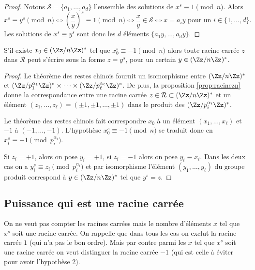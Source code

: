 \documentclass[11pt,class=report,crop=false]{standalone}
\begin{document}
\begin{proof}
Notons $\mathcal{S} = \{a_1,\ldots,a_d\}$ l'ensemble des solutions de $x^s \equiv 1 \pmod n$. Alors
$$x^s \equiv y^s \pmod n \iff \left( \frac{x}{y} \right)^s \equiv 1 \pmod n
\iff  \frac{x}{y} \in \mathcal{S} \iff x = a_iy \text { pour un } i \in \{1,\ldots,d\}.$$
Les solutions de $x^s \equiv y^s$ sont donc les $d$ éléments $\{a_1y,\ldots,a_dy\}$.
\end{proof}


\begin{lemme}
\label{lem:xs2}
S'il existe $x_0\in(\Zz/n\Zz)^*$ tel que $x_0^s \equiv -1 \pmod{n}$ alors 
toute racine carrée $z$ dans $\mathcal{R}$ peut s'écrire sous la forme $z=y^s$, pour un certain 
$y \in (\Zz/n\Zz)^*$.
\end{lemme}

\begin{proof}
Le théorème des restes chinois fournit un isomorphisme entre $(\Zz/n\Zz)^*$
et $(\Zz/p_1^{\alpha_1}\Zz)^* \times \cdots \times  (\Zz/p_\ell^{\alpha_\ell}\Zz)^*$.
De plus, la proposition \ref{prop:racinezn} donne la correspondance entre 
une racine carrée $z \in \mathcal{R} \subset (\Zz/n\Zz)^*$
et un élément $(z_1,\ldots,z_\ell) = (\pm1,\pm1,\ldots,\pm1)$ dans le produit des $(\Zz/p_i^{\alpha_i}\Zz)^*$.

Le théorème des restes chinois fait correspondre $x_0$ à un élément $(x_1,\ldots,x_\ell)$ et $-1$ à $(-1,\ldots,-1)$. L'hypothèse
$x_0^s \equiv -1 \pmod{n}$ se traduit donc en $x_i^s \equiv -1 \pmod {p_i^{\alpha_i}}$.

Si $z_i=+1$, alors on pose $y_i=+1$, si $z_i=-1$ alors on pose $y_i \equiv x_i$. Dans les deux cas on a $y_i^s \equiv z_i \pmod {p_i^{\alpha_i}}$ et par isomorphisme l'élément $(y_1,\ldots,y_\ell)$ du groupe produit correspond à $y \in (\Zz/n\Zz)^*$ tel que $y^s=z$.
\end{proof}

\subsection{Puissance qui est une racine carrée}

On ne veut pas compter les racines carrées mais le nombre d'éléments $x$ tel que $x^s$ soit une racine carrée.
On rappelle que dans tous les cas on exclut la racine carrée $1$ (qui n'a pas le bon ordre).
Mais par contre parmi les $x$ tel que $x^s$ soit une racine carrée on veut distinguer la racine carrée $-1$ (qui est celle à éviter pour avoir l'hypothèse 2).
\end{document}
